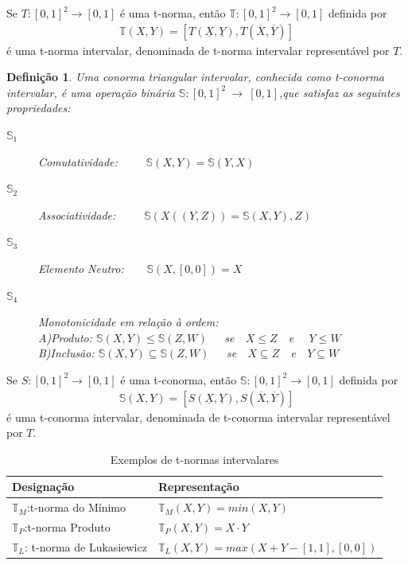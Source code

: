 \documentclass[tcc,capa]{texufpel}
\newtheorem{Def}{Defini\c c\~ao}
\begin{document}
Se $T:[0,1]^2\rightarrow [0,1]$ é uma t-norma, então $\mathbb{T}:[0,1]^2\rightarrow [0,1]$ definida por
\begin{eqnarray}\label{eqTI}
\mathbb{T}(X,Y)=[T(\underline{X},\underline{Y}),T(\overline{X},\overline{Y})]
\end{eqnarray}
é uma t-norma intervalar, denominada de t-norma intervalar representável por $T$.




\begin{Def}  Uma conorma triangular intervalar, conhecida como t-conorma intervalar, é uma operação binária $\mathbb{S}:[0,1]^2~\rightarrow~[0,1]$,que satisfaz as seguintes propriedades:
\begin{description}
  \item [$\mathbb{S}_1$] Comutatividade:~~~~~$\mathbb{S}(X,Y) = \mathbb{S}(Y,X)$
  \item [$\mathbb{S}_2$] Associatividade:~~~~~$\mathbb{S}(X((Y,Z))= \mathbb{S}(X,Y),Z)$
  \item [$\mathbb{S}_3$] Elemento Neutro:~~~~$\mathbb{S}(X,[0,0])=X$
  \item [$\mathbb{S}_4$] Monotonicidade  em relação à ordem:\\
  A)Produto: $\mathbb{S}(X,Y)\leq \mathbb{S}(Z,W)$~~~se~~$X\leq Z$~~e~~ $Y\leq W$\\
  B)Inclusão: $\mathbb{S}(X,Y)\subseteq \mathbb{S}(Z,W)$~~~se~~$X\subseteq Z$~~e~~$Y\subseteq W$
\end{description}
\end{Def}

Se $S:[0,1]^2\rightarrow [0,1]$ é uma t-conorma, então $\mathbb{S}:[0,1]^2\rightarrow [0,1]$ definida por
\begin{eqnarray}\label{eqTI}
\mathbb{S}(X,Y)=[S(\underline{X},\underline{Y}),S(\overline{X},\overline{Y})]
\end{eqnarray}
é uma t-conorma intervalar, denominada de t-conorma intervalar representável por $T$.

\begin{center}
\begin{table}[!h]
\caption{{\small Exemplos de t-normas intervalares}}
\centering
\label{tabnormasint}
\begin{tabular}{ll}
\hline
Designação & Representação  \\
\hline
$\mathbb{T}_{M}$:t-norma do Mínimo&  $\mathbb{T}_{M}(X,Y)=min(X,Y)$  \\
$\mathbb{T}_{P}$:t-norma Produto&  $\mathbb{T}_{P}(X,Y)=X\cdot Y$  \\
$\mathbb{T}_{L}$: t-norma de Lukasiewicz&  $\mathbb{T}_{L}(X,Y)=max(X+Y-[1,1],[0,0])$   \\
\hline
\end{tabular}
\end{table}
\end{center}
\end{document}
